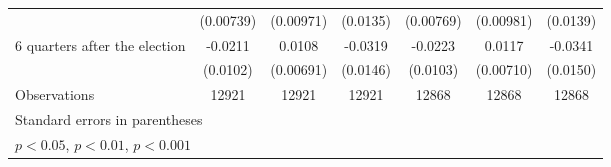 \begin{table}[!ht]
\begin{tabular}{l*{6}{c}}
                    &   (0.00739)         &   (0.00971)         &    (0.0135)         &   (0.00769)         &   (0.00981)         &    (0.0139)         \\
[1em]
 6 quarters after the election&     -0.0211\sym{*}  &      0.0108         &     -0.0319\sym{*}  &     -0.0223\sym{*}  &      0.0117         &     -0.0341\sym{*}  \\
                    &    (0.0102)         &   (0.00691)         &    (0.0146)         &    (0.0103)         &   (0.00710)         &    (0.0150)         \\
\hline
Observations        &       12921         &       12921         &       12921         &       12868         &       12868         &       12868         \\
\hline\hline
\multicolumn{7}{l}{\footnotesize Standard errors in parentheses}\\
\multicolumn{7}{l}{\footnotesize \sym{*} \(p<0.05\), \sym{**} \(p<0.01\), \sym{***} \(p<0.001\)}\\
\end{tabular}
\end{table}
